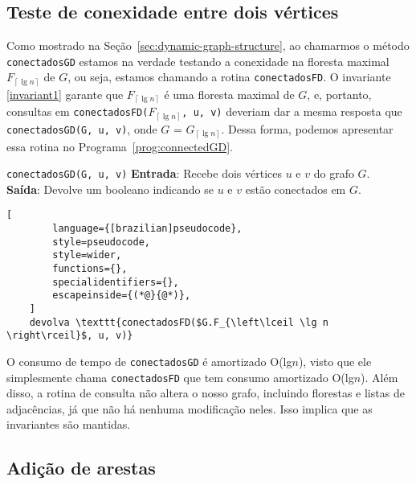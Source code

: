 \subsection{Teste de conexidade entre dois vértices}
\label{sec:code-connectivity-test}

Como mostrado na Seção~\ref{sec:dynamic-graph-structure}, ao chamarmos o método \texttt{conectadosGD} estamos na verdade testando a conexidade na floresta maximal $F_{\left\lceil \lg n \right\rceil}$ de $G$, ou seja, estamos chamando a rotina \texttt{conectadosFD}. O invariante \ref{invariant1} garante que $F_{\left\lceil \lg n \right\rceil}$ é uma floresta maximal de $G$, e, portanto, consultas em 
\texttt{conectadosFD($F_{\left\lceil \lg n \right\rceil}$, u, v)} deveriam dar a mesma resposta que \texttt{conectadosGD(G, u, v)}, onde $G$ = $G_{\left\lceil \lg n \right\rceil}$. Dessa forma, podemos apresentar essa rotina no Programa~\ref{prog:connectedGD}.

\begin{programruledcaption}{\texttt{conectadosGD(G, u, v)} \label{prog:connectedGD}}
    \noindent\textbf{Entrada}: Recebe dois vértices $u$ e $v$ do grafo $G$. \\
    \textbf{Saída}: Devolve um booleano indicando se $u$ e $v$ estão conectados em $G$.
    \vspace{-0.5\baselineskip}
    \begin{lstlisting}[
        language={[brazilian]pseudocode},
        style=pseudocode,
        style=wider,
        functions={},
        specialidentifiers={},
        escapeinside={(*@}{@*)},
    ]
    devolva \texttt{conectadosFD($G.F_{\left\lceil \lg n \right\rceil}$, u, v)}
    \end{lstlisting}
    \vspace{-0.5\baselineskip}
\end{programruledcaption}

O consumo de tempo de \texttt{conectadosGD} é amortizado O(lg$n$), visto que ele simplesmente chama \texttt{conectadosFD} que tem consumo amortizado O(lg$n$). Além disso, a rotina de consulta não altera o nosso grafo, incluindo florestas e listas de adjacências, já que não há nenhuma modificação neles. Isso implica que as invariantes são mantidas. 

\subsection{Adição de arestas}
\label{sec:code-edge-addition}

